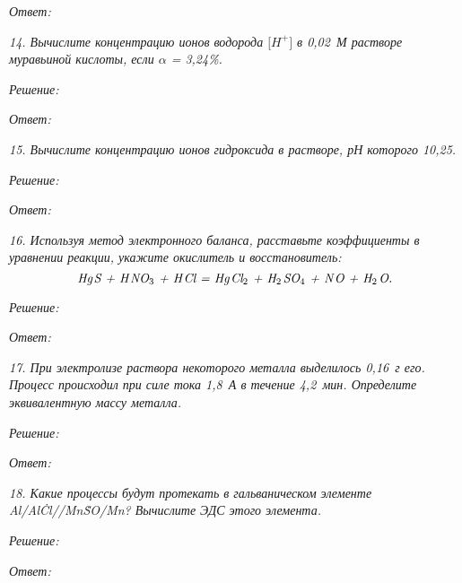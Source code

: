 \vspace*{2em}
\emph{Ответ: }

\newpage %

\emph{14. Вычислите концентрацию ионов водорода \( \bigr[H^+ \bigl] \) в 0,02~М
растворе муравьиной кислоты, если \( \alpha \) = 3,24\%.}

\vspace*{2em}
\emph{Решение:}

\vspace*{2em}
\emph{Ответ: }

\newpage %

\emph{15. Вычислите концентрацию ионов гидроксида в растворе, рН которого
10,25.}

\vspace*{2em}
\emph{Решение:}

\vspace*{2em}
\emph{Ответ: }

\newpage %

\emph{16. Используя метод электронного баланса, расставьте коэффициенты в
уравнении реакции, укажите окислитель и восстановитель:} \vspace*{-1em}
\[
    \textit{Hg\;\!S + H\;\!NO\( _{3} \) + H\;\!Cl = Hg\;\!Cl\( _{2} \) + H\( _{2} \)\;\!SO\( _{4} \)
    + N\;\!O + H\( _{2} \)\;\!O.}
\]

\vspace*{1em}
\emph{Решение:}

\vspace*{2em}
\emph{Ответ: }

\newpage %

\emph{17. При электролизе раствора некоторого металла выделилось 0,16~г его.
Процесс происходил при силе тока 1,8~А в течение 4,2~мин. Определите
эквивалентную массу металла.}

\vspace*{2em}
\emph{Решение:}

\vspace*{2em}
\emph{Ответ: }

\newpage %

\emph{18. Какие процессы будут протекать в гальваническом элементе\\
Al\;/\;Al\.Cl\;//\;Mn\.SO\;/\;Mn? Вычислите ЭДС этого элемента.}

\vspace*{2em}
\emph{Решение:}

\vspace*{2em}
\emph{Ответ: }


